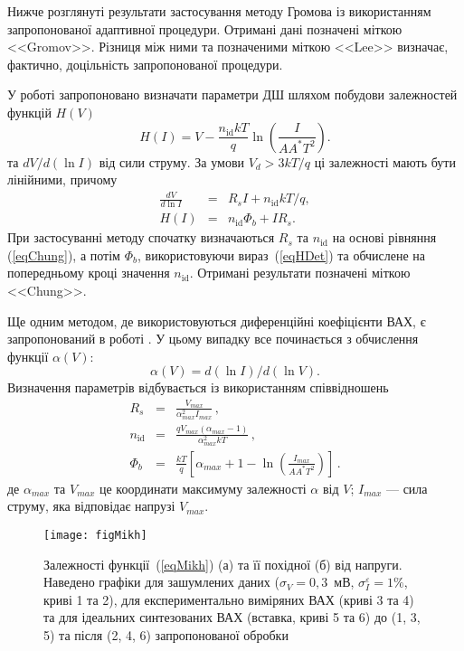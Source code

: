 Нижче розглянуті результати застосування методу Громова із використанням запропонованої адаптивної процедури.
Отримані дані позначені міткою <<Gromov>>.
Різниця між ними та позначеними міткою <<Lee>> визначає, фактично, доцільність запропонованої процедури.

У роботі \cite{Cheung} запропоновано визначати параметри ДШ шляхом побудови залежностей функцій $H(V)$
\begin{equation}
\label{eqH}
H(I)=V-\frac{n_\mathrm{id}kT}{q}\ln\left(\frac{I}{AA^*T^2}\right).
\end{equation}
та $dV/d(\ln I)$ від сили струму.
За умови $V_d>3kT/q$ ці залежності мають бути лінійними, причому
\begin{eqnarray}
\label{eqChung}
\frac{dV}{d\ln I}&=&R_sI+n_\mathrm{id}kT/q,
\\
\label{eqHDet}
H(I)&=&n_\mathrm{id}\Phi_b+IR_s.
\end{eqnarray}
При застосуванні методу спочатку визначаються $R_s$ та  $n_\mathrm{id}$ на основі рівняння (\ref{eqChung}),
а потім  $\Phi_b$, використовуючи вираз~(\ref{eqHDet}) та обчислене на попередньому кроці значення $n_\mathrm{id}$.
Отримані результати позначені міткою <<Chung>>.

Ще одним методом, де використовуються диференційні коефіцієнти ВАХ, є запропонований в роботі \cite{Mikhelashvili}.
У цьому випадку все починається з обчислення функції  $\alpha(V)$:
\begin{equation}
\label{eqMikh}
\alpha(V)=d(\ln I)/d(\ln V).
\end{equation}
Визначення параметрів відбувається із використанням співвідношень
\begin{eqnarray}
\label{eqMikhDet}
R_s&=&\frac{V_{max}}{\alpha^2_{max}I_{max}}\,,
\\
n_\mathrm{id}&=&\frac{qV_{max}(\alpha_{max}-1)}{\alpha_{max}^2kT}\,,
\\
\Phi_b&=&\frac{kT}{q}\left[\alpha_{max}+1-\ln\left(\frac{I_{max}}{AA^*T^2}\right)\right]\,.\label{eqMikhDetFi}
\end{eqnarray}
де
$\alpha_{max}$ та $V_{max}$  це координати максимуму залежності $\alpha$ від $V$;
$I_{max}$ --- сила струму, яка відповідає напрузі $V_{max}$.

\begin{figure}
\center
\texttt{[image: figMikh]}%
\caption{\label{figMikh}
Залежності функції~(\ref{eqMikh}) (а) та її похідної (б) від напруги.
Наведено графіки для зашумлених даних ($\sigma_V=0,3$~мВ, $\sigma_I^\varepsilon=1\%$, криві 1 та 2), для експериментально виміряних ВАХ (криві 3 та 4) та для ідеальних синтезованих ВАХ (вставка, криві 5 та 6) до (1, 3, 5) та після (2, 4, 6) запропонованої обробки
}
\end{figure}

